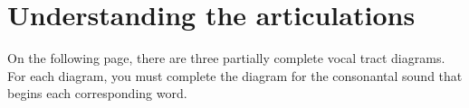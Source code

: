 \documentclass[12pt, letterpaper]{article}
\begin{document}
\section*{Understanding the articulations}

On the following page, there are three partially complete vocal tract diagrams. For each diagram, you must complete the diagram for the consonantal sound that begins each corresponding word.




\printbibliography[heading=bibintoc]
\end{document}
